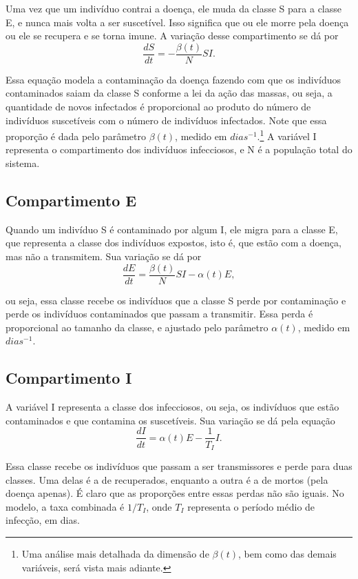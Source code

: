 \documentclass{article}
\begin{document}
Uma vez que um indivíduo contrai a doença, ele muda da classe S para a classe E, e nunca mais volta a ser suscetível. Isso significa que ou ele morre pela doença ou ele se recupera e se torna imune. A variação desse compartimento se dá por
\[\dfrac{dS}{dt} = -\dfrac{\beta(t)}{N}SI.\]

Essa equação modela a contaminação da doença fazendo com que os indivíduos contaminados saiam da classe S conforme a lei da ação das massas, ou seja, a quantidade de novos infectados é proporcional ao produto do número de indivíduos suscetíveis com o número de indivíduos infectados. Note que essa proporção é dada pelo parâmetro $\beta(t)$, medido em $dias^{-1}$.\footnote{Uma análise mais detalhada da dimensão de $\beta(t)$, bem como das demais variáveis, será vista mais adiante.} A variável I representa o compartimento dos indivíduos infecciosos, e N é a população total do sistema.

\subsection*{Compartimento E}

Quando um indivíduo S é contaminado por algum I, ele migra para a classe E, que representa a classe dos indivíduos expostos, isto é, que estão com a doença, mas não a transmitem. Sua variação se dá por
\[\dfrac{dE}{dt} = \dfrac{\beta(t)}{N}SI - \alpha(t) E,\]

\noindent ou seja, essa classe recebe os indivíduos que a classe S perde por contaminação e perde os indivíduos contaminados que passam a transmitir. Essa perda é proporcional ao tamanho da classe, e ajustado pelo parâmetro $\alpha(t)$, medido em $dias^{-1}$.

\subsection*{Compartimento I}

A variável I representa a classe dos infecciosos, ou seja, os indivíduos que estão contaminados e que contamina os suscetíveis. Sua variação se dá pela equação
\[\dfrac{dI}{dt} = \alpha(t) E - \dfrac{1}{T_I}I.\]

Essa classe recebe os indivíduos que passam a ser transmissores e perde para duas classes. Uma delas é a de recuperados, enquanto a outra é a de mortos (pela doença apenas). É claro que as proporções entre essas perdas não são iguais. No modelo, a taxa combinada é $1/T_I$, onde $T_I$ representa o período médio de infecção, em dias.
\end{document}
